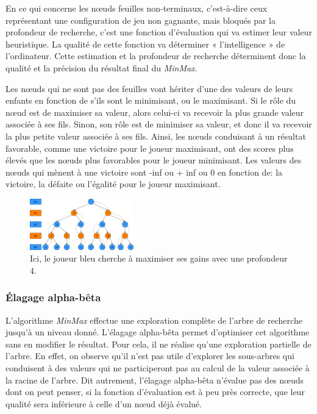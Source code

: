 En ce qui concerne les nœuds feuilles non-terminaux, c’est-à-dire ceux représentant une configuration de jeu non gagnante, mais bloqués par la 
profondeur de recherche, c’est une fonction d’évaluation qui va estimer leur valeur heuristique. La qualité de cette fonction va 
déterminer « l'intelligence » de l'ordinateur. Cette estimation et la profondeur de recherche déterminent donc la qualité et la 
précision du résultat final du \emph{MinMax}.

Les nœuds qui ne sont pas des feuilles vont hériter d'une des valeurs de leurs enfants en fonction de s'ils sont le minimisant, ou le maximisant.
Si le rôle du nœud est de maximiser sa valeur, alors celui-ci va recevoir la plus grande valeur associée à ses fils. Sinon, son rôle est de 
minimiser sa valeur, et donc il va recevoir la plus petite valeur associée à ses fils.
Ainsi, les nœuds conduisant à un résultat favorable, comme une victoire pour le joueur maximisant, ont des scores plus
élevés que les nœuds plus favorables pour le joueur minimisant. Les valeurs des nœuds qui mènent à une victoire sont -inf ou + inf ou 0 en fonction de:
la victoire, la défaite ou l'égalité pour le joueur maximisant. 


\begin{figure}[h]
    \begin{center}
        \includegraphics[width=0.4\textwidth]{root/MinMax.jpeg}
    \end{center}
    \caption{Ici, le joueur bleu cherche à maximiser ses gains avec une profondeur 4.}\label{fig:min_max}
\end{figure}


\subsubsection{Élagage alpha-bêta}
L'algorithme \emph{MinMax} effectue une exploration complète de l'arbre de recherche jusqu'à un niveau donné. L'élagage alpha-bêta permet d'optimiser 
cet algorithme sans en modifier le résultat. Pour cela, il ne réalise qu'une exploration
partielle de l'arbre. En effet, on observe qu'il n'est pas utile d'explorer les sous-arbres qui conduisent à des valeurs
qui ne participeront pas au calcul de la valeur associée à la racine de l'arbre. Dit autrement, l'élagage alpha-bêta n'évalue pas des nœuds
dont on peut penser, si la fonction d'évaluation est à peu près correcte, que leur qualité sera inférieure à celle d'un nœud déjà évalué.

